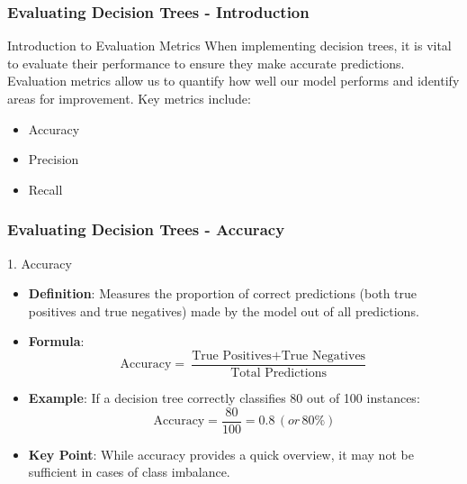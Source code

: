 \documentclass[aspectratio=169]{beamer}
\begin{document}
\begin{frame}[fragile]
    \frametitle{Evaluating Decision Trees - Introduction}
    \begin{block}{Introduction to Evaluation Metrics}
        When implementing decision trees, it is vital to evaluate their performance to ensure they make accurate predictions. Evaluation metrics allow us to quantify how well our model performs and identify areas for improvement. Key metrics include:
        \begin{itemize}
            \item Accuracy
            \item Precision
            \item Recall
        \end{itemize}
    \end{block}
\end{frame}

\begin{frame}[fragile]
    \frametitle{Evaluating Decision Trees - Accuracy}
    \begin{block}{1. Accuracy}
        \begin{itemize}
            \item \textbf{Definition}: Measures the proportion of correct predictions (both true positives and true negatives) made by the model out of all predictions.
            \item \textbf{Formula}:
            \begin{equation}
            \text{Accuracy} = \frac{\text{True Positives} + \text{True Negatives}}{\text{Total Predictions}}
            \end{equation}
            \item \textbf{Example}: If a decision tree correctly classifies 80 out of 100 instances:
            \begin{equation}
            \text{Accuracy} = \frac{80}{100} = 0.8 \, (or \, 80\%)
            \end{equation}
            \item \textbf{Key Point}: While accuracy provides a quick overview, it may not be sufficient in cases of class imbalance.
        \end{itemize}
    \end{block}
\end{frame}
\end{document}
